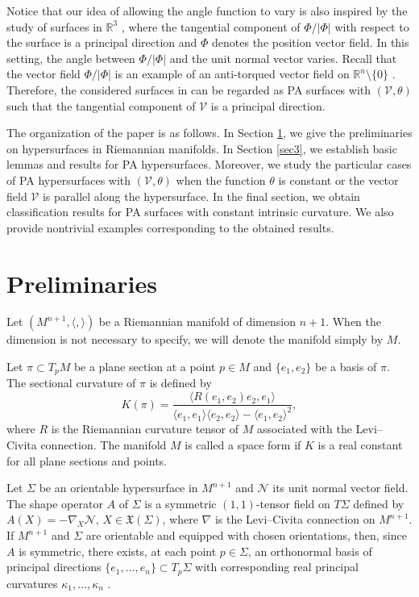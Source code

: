 \documentclass[12pt,reqno]{amsart}
\def\r{\mathbb R}
\def\v{\mathcal V}
\def\n{\mathcal N}
\def\x{\mathfrak X}
\theoremstyle{definition}
\begin{document}
Notice that our idea of allowing the angle function to vary is also inspired by the study of surfaces in $\r^3$ \cite{mun11}, where the tangential component of $\Phi/|\Phi|$ with respect to the surface is a principal direction and $\Phi$ denotes the position vector field. In this setting, the angle between $\Phi/|\Phi|$ and the unit normal vector varies. Recall that the vector field $\Phi/|\Phi|$ is an example of an anti-torqued vector field on $\r^n\setminus\{0\}$ \cite{dan}. Therefore, the considered surfaces in \cite{mun11} can be regarded as PA surfaces with $(\v,\theta)$ such that the tangential component of $\v$ is a principal direction.

The organization of the paper is as follows. In Section \ref{pre}, we give the preliminaries on hypersurfaces in Riemannian manifolds. In Section \ref{sec3}, we establish basic lemmas and results for PA hypersurfaces. Moreover, we study the particular cases of PA hypersurfaces with $(\v,\theta)$ when the function $\theta$ is constant or the vector field $\v$ is parallel along the hypersurface. In the final section, we obtain classification results for PA surfaces with constant intrinsic curvature. We also provide nontrivial examples corresponding to the obtained results.


\section{Preliminaries} \label{pre}

Let $(M^{n+1},\langle,\rangle)$ be a Riemannian manifold of dimension $n+1$. When the dimension is not necessary to specify, we will denote the manifold simply by $M$.

Let $\pi\subset T_pM$ be  a plane section at a point $p \in M$ and $\{e_1,e_2\}$ be a basis of $\pi$. The sectional curvature of $\pi$ is defined by
$$
K(\pi)=\frac{\langle R(e_1,e_2)e_2,e_1\rangle}{\langle e_1,e_1\rangle \langle e_2,e_2\rangle-\langle e_1,e_2\rangle^2},
$$
where $R$ is the Riemannian curvature tensor of $M$ associated with the Levi–Civita connection. The manifold $M$ is called a space form if $K$ is a real constant for all plane sections and points. 

Let $\Sigma$ be an orientable hypersurface in $M^{n+1}$ and $\n$ its unit normal vector field. The shape operator $A$ of $\Sigma$ is a symmetric $(1,1)$-tensor field  on $T\Sigma$ defined by $A(X)=-\nabla_X \n$, $X\in \x(\Sigma)$, where $\nabla$ is the Levi–Civita connection on $M^{n+1}$. If $M^{n+1}$ and $\Sigma$ are orientable and equipped with chosen orientations, then, since $A$ is symmetric, there exists, at each point $p\in\Sigma$, an orthonormal basis of principal directions $\{e_1,\dots,e_n\}\subset T_p\Sigma$ with corresponding real principal curvatures $\kappa_1,\dots,\kappa_n$ \cite{car}. %
\end{document}
